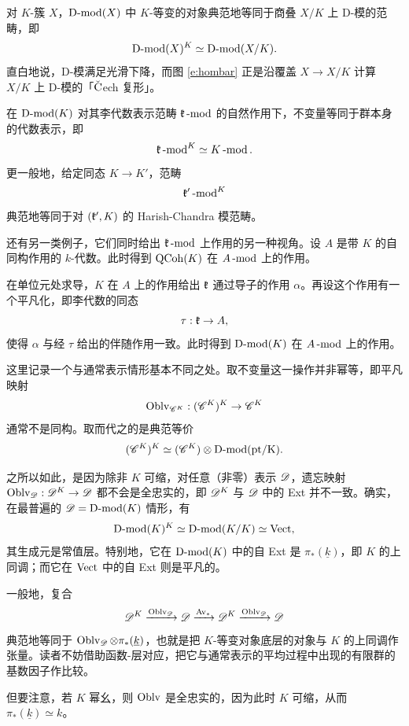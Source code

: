 \begin{ex} \label{e:dmodquotstack} 对 $K$-簇 $X$，$\Dmod(X)$ 中 $K$-等变的对象典范地等同于商叠 $X/K$ 上 D-模的范畴，即
%
\[
     \Dmod(X)^K \simeq \Dmod(X/K).
\]
%
直白地说，D-模满足光滑下降，而图 \eqref{e:hombar} 正是沿覆盖 $X
\rightarrow X/K$ 计算 $X/K$ 上 D-模的「$\check{\on{C}}$ech 复形」。
\end{ex}

\begin{ex} 在 $\Dmod(K)$ 对其李代数表示范畴 $\fk\mod$ 的自然作用下，不变量等同于群本身的代数表示，即
%
\[
      \fk\mod^K \simeq K\mod.
\]
%
更一般地，给定同态 $K \rightarrow K'$，范畴
%
\[
 \fk'\mod^K
\]
%
典范地等同于对 $(\fk', K)$ 的 Harish-Chandra 模范畴。
\end{ex}

\begin{ex} 还有另一类例子，它们同时给出 $\fk\mod$ 上作用的另一种视角。设 $A$ 是带 $K$ 的自同构作用的 $k$-代数。此时得到 $\QCoh(K)$ 在 $A\mod$ 上的作用。

在单位元处求导，$K$ 在 $A$ 上的作用给出 $\fk$ 通过导子的作用 $\alpha$。再设这个作用有一个平凡化，即李代数的同态 $$\tau: \fk \rightarrow A,$$使得 $\alpha$ 与经 $\tau$ 给出的伴随作用一致。此时得到 $\Dmod(K)$ 在 $A\mod$ 上的作用。 \end{ex}

\begin{re}\label{r:invariantstwice}这里记录一个与通常表示情形基本不同之处。取不变量这一操作并非幂等，即平凡映射
%
\[
   \on{Oblv}_{\sC^K}: (\sC^K)^K \rightarrow \sC^K
\]
%
通常不是同构。取而代之的是典范等价
%
\[
   (\sC^K)^K \simeq (\sC^K) \otimes \Dmod(\on{pt/K}).
\]
%

之所以如此，是因为除非 $K$ 可缩，对任意（非零）表示 $\sD$，遗忘映射 $\on{Oblv}_{\sD}: \sD^K \rightarrow \sD$ 都不会是全忠实的，即 $\sD^K$ 与 $\sD$ 中的 Ext 并不一致。确实，在最普遍的 $\sD = \Dmod(K)$ 情形，有
%
\[
\Dmod(K)^K \simeq \Dmod(K / K) \simeq \Vect,
\]
%
其生成元是常值层。特别地，它在 $\Dmod(K)$ 中的自 Ext 是 $\pi_*(\underline{k})$，即 $K$ 的上同调；而它在 $\Vect$ 中的自 Ext 则是平凡的。

一般地，复合
%
\[
    \sD^K \xrightarrow{\on{Oblv}_{\sD}} \sD \xrightarrow{\on{Av}_*} \sD^K
    \xrightarrow{\on{Oblv}_{\sD}} \sD
\]
%
典范地等同于 $\on{Oblv}_{\sD} \otimes \pi_*(\underline{k})$，也就是把 $K$-等变对象底层的对象与 $K$ 的上同调作张量。读者不妨借助函数-层对应，把它与通常表示的平均过程中出现的有限群的基数因子作比较。

但要注意，若 $K$ 幂幺，则 $\on{Oblv}$ 是全忠实的，因为此时 $K$ 可缩，从而 $\pi_*(\underline{k}) \simeq k$。 \end{re}

